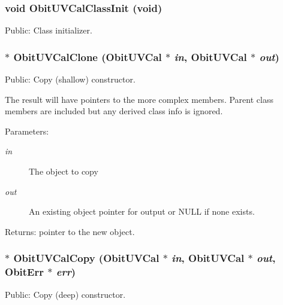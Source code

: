 \subsubsection{\setlength{\rightskip}{0pt plus 5cm}void Obit\-UVCal\-Class\-Init (void)}\label{ObitUVCal_8h_a8}


Public: Class initializer. 

\subsubsection{$\ast$ Obit\-UVCal\-Clone ({\bf Obit\-UVCal} $\ast$ {\em in}, {\bf Obit\-UVCal} $\ast$ {\em out})}\label{ObitUVCal_8h_a12}


Public: Copy (shallow) constructor. 

The result will have pointers to the more complex members. Parent class members are included but any derived class info is ignored. \begin{Desc}
\item[Parameters:]
\begin{description}
\item[{\em in}]The object to copy \item[{\em out}]An existing object pointer for output or NULL if none exists. \end{description}
\end{Desc}
\begin{Desc}
\item[Returns:]pointer to the new object. \end{Desc}
\subsubsection{$\ast$ Obit\-UVCal\-Copy ({\bf Obit\-UVCal} $\ast$ {\em in}, {\bf Obit\-UVCal} $\ast$ {\em out}, {\bf Obit\-Err} $\ast$ {\em err})}\label{ObitUVCal_8h_a11}


Public: Copy (deep) constructor. 

